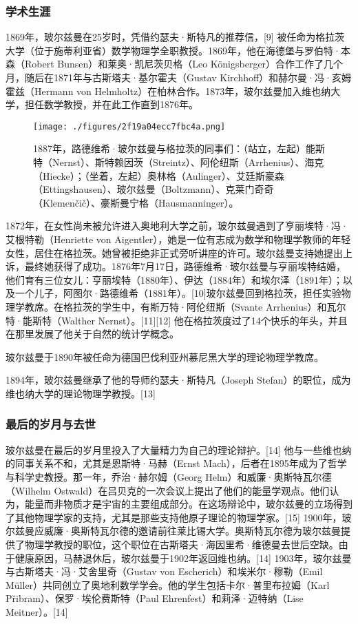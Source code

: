 \subsubsection{学术生涯} 
1869年，玻尔兹曼在25岁时，凭借约瑟夫·斯特凡的推荐信，[9] 被任命为格拉茨大学（位于施蒂利亚省）数学物理学全职教授。1869年，他在海德堡与罗伯特·本森（Robert Bunsen）和莱奥·凯尼茨贝格（Leo Königsberger）合作工作了几个月，随后在1871年与古斯塔夫·基尔霍夫（Gustav Kirchhoff）和赫尔曼·冯·亥姆霍兹（Hermann von Helmholtz）在柏林合作。1873年，玻尔兹曼加入维也纳大学，担任数学教授，并在此工作直到1876年。
\begin{figure}[ht]
\centering
\texttt{[image: ./figures/2f19a04ecc7fbc4a.png]}
\caption{1887年，路德维希·玻尔兹曼与格拉茨的同事们：（站立，左起）能斯特（Nernst）、斯特赖因茨（Streintz）、阿伦纽斯（Arrhenius）、海克（Hiecke）；（坐着，左起）奥林格（Aulinger）、艾廷斯豪森（Ettingshausen）、玻尔兹曼（Boltzmann）、克莱门奇奇（Klemenčič）、豪斯曼宁格（Hausmanninger）。} \label{fig_BRZM_2}
\end{figure}
1872年，在女性尚未被允许进入奥地利大学之前，玻尔兹曼遇到了亨丽埃特·冯·艾根特勒（Henriette von Aigentler），她是一位有志成为数学和物理学教师的年轻女性，居住在格拉茨。她曾被拒绝非正式旁听讲座的许可。玻尔兹曼支持她提出上诉，最终她获得了成功。1876年7月17日，路德维希·玻尔兹曼与亨丽埃特结婚，他们育有三位女儿：亨丽埃特（1880年）、伊达（1884年）和埃尔泽（1891年）；以及一个儿子，阿图尔·路德维希（1881年）。[10]玻尔兹曼回到格拉茨，担任实验物理学教席。在格拉茨的学生中，有斯万特·阿伦纽斯（Svante Arrhenius）和瓦尔特·能斯特（Walther Nernst）。[11][12] 他在格拉茨度过了14个快乐的年头，并且在那里发展了他关于自然的统计学概念。

玻尔兹曼于1890年被任命为德国巴伐利亚州慕尼黑大学的理论物理学教席。

1894年，玻尔兹曼继承了他的导师约瑟夫·斯特凡（Joseph Stefan）的职位，成为维也纳大学的理论物理学教授。[13]
\subsubsection{最后的岁月与去世}
玻尔兹曼在最后的岁月里投入了大量精力为自己的理论辩护。[14] 他与一些维也纳的同事关系不和，尤其是恩斯特·马赫（Ernst Mach），后者在1895年成为了哲学与科学史教授。那一年，乔治·赫尔姆（Georg Helm）和威廉·奥斯特瓦尔德（Wilhelm Ostwald）在吕贝克的一次会议上提出了他们的能量学观点。他们认为，能量而非物质才是宇宙的主要组成部分。在这场辩论中，玻尔兹曼的立场得到了其他物理学家的支持，尤其是那些支持他原子理论的物理学家。[15] 1900年，玻尔兹曼应威廉·奥斯特瓦尔德的邀请前往莱比锡大学。奥斯特瓦尔德为玻尔兹曼提供了物理学教授的职位，这个职位在古斯塔夫·海因里希·维德曼去世后空缺。由于健康原因，马赫退休后，玻尔兹曼于1902年返回维也纳。[14] 1903年，玻尔兹曼与古斯塔夫·冯·艾舍里奇（Gustav von Escherich）和埃米尔·穆勒（Emil Müller）共同创立了奥地利数学学会。他的学生包括卡尔·普里布拉姆（Karl Přibram）、保罗·埃伦费斯特（Paul Ehrenfest）和莉泽·迈特纳（Lise Meitner）。[14]


